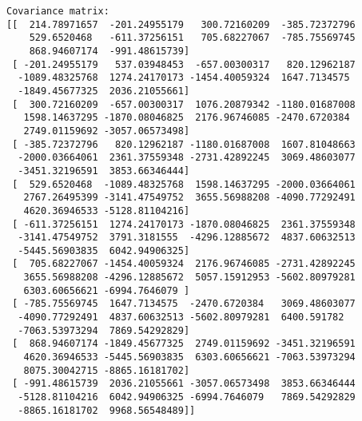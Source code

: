     \begin{Verbatim}[commandchars=\\\{\}]
Covariance matrix:
[[  214.78971657  -201.24955179   300.72160209  -385.72372796
    529.6520468   -611.37256151   705.68227067  -785.75569745
    868.94607174  -991.48615739]
 [ -201.24955179   537.03948453  -657.00300317   820.12962187
  -1089.48325768  1274.24170173 -1454.40059324  1647.7134575
  -1849.45677325  2036.21055661]
 [  300.72160209  -657.00300317  1076.20879342 -1180.01687008
   1598.14637295 -1870.08046825  2176.96746085 -2470.6720384
   2749.01159692 -3057.06573498]
 [ -385.72372796   820.12962187 -1180.01687008  1607.81048663
  -2000.03664061  2361.37559348 -2731.42892245  3069.48603077
  -3451.32196591  3853.66346444]
 [  529.6520468  -1089.48325768  1598.14637295 -2000.03664061
   2767.26495399 -3141.47549752  3655.56988208 -4090.77292491
   4620.36946533 -5128.81104216]
 [ -611.37256151  1274.24170173 -1870.08046825  2361.37559348
  -3141.47549752  3791.3181555  -4296.12885672  4837.60632513
  -5445.56903835  6042.94906325]
 [  705.68227067 -1454.40059324  2176.96746085 -2731.42892245
   3655.56988208 -4296.12885672  5057.15912953 -5602.80979281
   6303.60656621 -6994.7646079 ]
 [ -785.75569745  1647.7134575  -2470.6720384   3069.48603077
  -4090.77292491  4837.60632513 -5602.80979281  6400.591782
  -7063.53973294  7869.54292829]
 [  868.94607174 -1849.45677325  2749.01159692 -3451.32196591
   4620.36946533 -5445.56903835  6303.60656621 -7063.53973294
   8075.30042715 -8865.16181702]
 [ -991.48615739  2036.21055661 -3057.06573498  3853.66346444
  -5128.81104216  6042.94906325 -6994.7646079   7869.54292829
  -8865.16181702  9968.56548489]]


\end{Verbatim}
